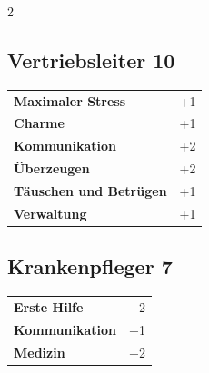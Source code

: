 \begin{multicols}{2}
\begin{tcolorbox}

\end{tcolorbox}

\begin{tcolorbox}
    \subsection*{Vertriebsleiter \hfill \small{10 }}
    \tcblower




\begin{tabular}{@{}ll@{}}
    \textbf{Maximaler Stress} & +1\\
    \textbf{Charme} & +1\\
    \textbf{Kommunikation} & +2\\
    \textbf{Überzeugen} & +2\\
    \textbf{Täuschen und Betrügen} & +1\\
    \textbf{Verwaltung} & +1\\
\end{tabular}


\end{tcolorbox}

\begin{tcolorbox}
    \subsection*{Krankenpfleger \hfill \small{7 }}
    \tcblower




\begin{tabular}{@{}ll@{}}
    \textbf{Erste Hilfe} & +2\\
    \textbf{Kommunikation} & +1\\
    \textbf{Medizin} & +2\\
\end{tabular}



\end{tcolorbox}
\end{multicols}
